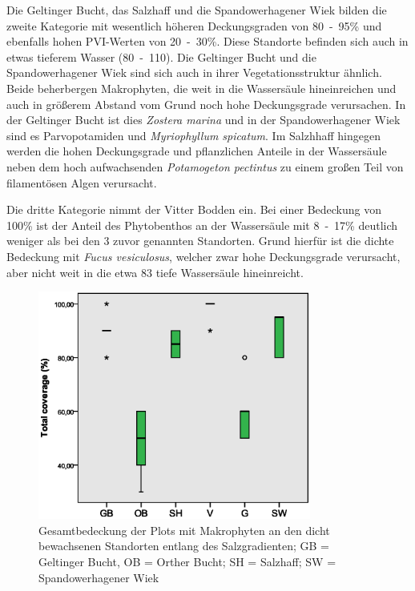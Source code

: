 Die Geltinger Bucht, das Salzhaff und die Spandowerhagener Wiek bilden die zweite Kategorie mit wesentlich höheren Deckungsgraden von \unit{80-95}{\%} und ebenfalls hohen PVI-Werten von \unit{20-30}{\%}. Diese Standorte befinden sich auch in etwas tieferem Wasser (\unit{80-110}{\centi\metre}). Die Geltinger Bucht und die Spandowerhagener Wiek sind sich auch in ihrer Vegetationsstruktur ähnlich. Beide beherbergen Makrophyten, die weit in die Wassersäule hineinreichen und auch in größerem Abstand vom Grund noch hohe Deckungsgrade verursachen. In der Geltinger Bucht ist dies \textit{Zostera marina} und in der Spandowerhagener Wiek sind es Parvopotamiden und \textit{Myriophyllum spicatum}. Im Salzhhaff hingegen werden die hohen Deckungsgrade und pflanzlichen Anteile in der Wassersäule neben dem hoch aufwachsenden \textit{Potamogeton pectintus} zu einem großen Teil von filamentösen Algen verursacht.

Die dritte Kategorie nimmt der Vitter Bodden ein. Bei einer Bedeckung von \unit{100}{\%} ist der Anteil des Phytobenthos an der Wassersäule mit \unit{8-17}{\%} deutlich weniger als bei den 3 zuvor genannten Standorten. Grund hierfür ist die dichte Bedeckung mit \textit{Fucus vesiculosus}, welcher zwar hohe Deckungsgrade verursacht, aber nicht weit in die etwa \unit{83}{\centi\metre} tiefe Wassersäule hineinreicht.



\begin{figure}[!htb]
\centering
\includegraphics[width=0.80\textwidth]{images/total_cover/cover_salzgradient.eps}
\caption[Bedeckung mit Makrophyten an Standorten entlang des Salzgradienten]{Gesamtbedeckung der Plots mit Makrophyten an den dicht bewachsenen Standorten entlang des Salzgradienten; GB = Geltinger Bucht, OB = Orther Bucht; SH = Salzhaff; SW = Spandowerhagener Wiek}
\label{fig:cover_salzgradient}
\end{figure}

